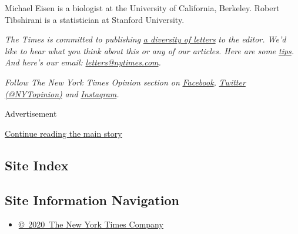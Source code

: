 Michael Eisen is a biologist at the University of California, Berkeley.
Robert Tibshirani is a statistician at Stanford University.

\emph{The Times is committed to publishing}
\href{https://www.nytimes.com/2019/01/31/opinion/letters/letters-to-editor-new-york-times-women.html}{\emph{a
diversity of letters}} \emph{to the editor. We'd like to hear what you
think about this or any of our articles. Here are some}
\href{https://help.nytimes.com/hc/en-us/articles/115014925288-How-to-submit-a-letter-to-the-editor}{\emph{tips}}\emph{.
And here's our email:}
\href{mailto:letters@nytimes.com}{\emph{letters@nytimes.com}}\emph{.}

\emph{Follow The New York Times Opinion section on}
\href{https://www.facebook.com/nytopinion}{\emph{Facebook}}\emph{,}
\href{http://twitter.com/NYTOpinion}{\emph{Twitter (@NYTopinion)}}
\emph{and}
\href{https://www.instagram.com/nytopinion/}{\emph{Instagram}}\emph{.}

Advertisement

\protect\hyperlink{after-bottom}{Continue reading the main story}

\hypertarget{site-index}{%
\subsection{Site Index}\label{site-index}}

\hypertarget{site-information-navigation}{%
\subsection{Site Information
Navigation}\label{site-information-navigation}}

\begin{itemize}
\tightlist
\item
  \href{https://help.nytimes.com/hc/en-us/articles/115014792127-Copyright-notice}{©~2020~The
  New York Times Company}
\end{itemize}

